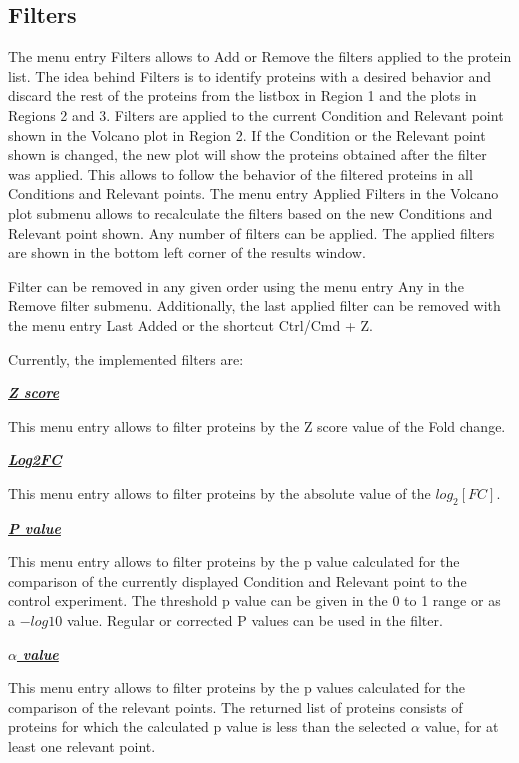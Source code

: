 \subsection{Filters}

The menu entry Filters allows to Add or Remove the filters applied to the protein list. The idea behind Filters is to identify proteins with a desired behavior and discard the rest of the proteins from the listbox in Region \num{1} and the plots in Regions \num{2} and \num{3}. Filters are applied to the current Condition and Relevant point shown in the Volcano plot in Region \num{2}. If the Condition or the Relevant point shown is changed, the new plot will show the proteins obtained after the filter was applied. This allows to follow the behavior of the filtered proteins in all Conditions and Relevant points. The menu entry Applied Filters in the Volcano plot submenu allows to recalculate the filters based on the new Conditions and Relevant point shown. Any number of filters can be applied. The applied filters are shown in the bottom left corner of the results window. 

Filter can be removed in any given order using the menu entry Any in the Remove filter submenu. Additionally, the last applied filter can be removed with the menu entry Last Added or the shortcut Ctrl/Cmd + Z.

Currently, the implemented filters are:

\textbf{\textit{\underline{Z score}}}

This menu entry allows to filter proteins by the Z score value of the Fold change. 

\textbf{\textit{\underline{Log2FC}}}

This menu entry allows to filter proteins by the absolute value of the $log_2[FC]$. 

\textbf{\textit{\underline{P value}}}

This menu entry allows to filter proteins by the p value calculated for the comparison of the currently displayed  Condition and Relevant point to the control experiment. The threshold p value can be given in the 0 to 1 range or as a $-log10$ value. Regular or corrected P values can be used in the filter.

\textbf{\textit{\underline{$\alpha$ value}}}

This menu entry allows to filter proteins by the p values calculated for the comparison of the relevant points. The returned list of proteins consists of proteins for which the calculated p value is less than the selected $\alpha$ value, for at least one relevant point.

